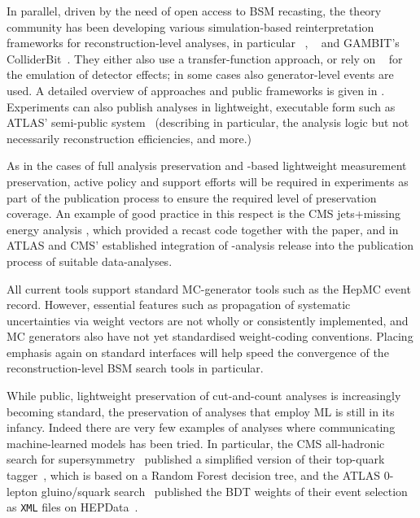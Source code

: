 \documentclass[11pt]{article}
\begin{document}
In parallel, driven by the need of open access to \gls{BSM} recasting, the theory community has been developing various simulation-based reinterpretation frameworks for reconstruction-level analyses, in particular \checkmate~\cite{Drees:2013wra,Dercks:2016npn}, \madanalysis~\cite{Dumont:2014tja,Conte:2018vmg} and GAMBIT's ColliderBit~\cite{GAMBIT:2017qxg}. They either also use a transfer-function approach, or rely on \delphes~\cite{deFavereau:2013fsa} for the emulation of detector effects; in some cases also generator-level events are used. A detailed overview of approaches and public frameworks is given in \cite{LHCReinterpretationForum:2020xtr}.
%
Experiments can also publish analyses in lightweight, executable form such as \gls{ATLAS}' semi-public \simpleanalysis system~\cite{atlas:simpleanalysis} 
(describing in particular, the analysis logic but not necessarily reconstruction efficiencies, and more.)

As in the cases of full analysis preservation and \rivet-based lightweight measurement preservation, active policy and support efforts will be required in experiments as part of the publication process to ensure the required level of preservation coverage. An example of good practice in this respect is the \gls{CMS} jets+missing energy analysis \cite{CMS:2021far}, which provided a \madanalysis recast code \cite{Albert:2774586,DVN/IRF7ZL_2021} together with the paper, and in \gls{ATLAS} and \gls{CMS}' established integration of \rivet-analysis release into the publication process of suitable data-analyses.

All current tools support standard MC-generator tools such as the HepMC event record. However, essential features such as propagation of systematic uncertainties via weight vectors are not wholly or consistently implemented, and MC generators also have not yet standardised weight-coding conventions. Placing emphasis again on standard interfaces will help speed the convergence of the reconstruction-level \gls{BSM} search tools in particular.

While public, lightweight preservation of cut-and-count analyses is increasingly becoming standard, the preservation of analyses that employ \gls{ML} is still in its infancy. 
Indeed there are very few examples of analyses where communicating machine-learned models has been tried. In particular, the \gls{CMS} all-hadronic search for supersymmetry~\cite{CMS:2017qxu} published a simplified version of their top-quark tagger~\cite{cms:toptagger}, which is based on a Random Forest decision tree, and the \gls{ATLAS} 0-lepton gluino/squark search~\cite{ATLAS:2020syg,Uno:2763449} published the \gls{BDT} weights of their event selection as \texttt{XML} files on HEPData~\cite{hepdata.95664.v2/r8}.  
\end{document}
